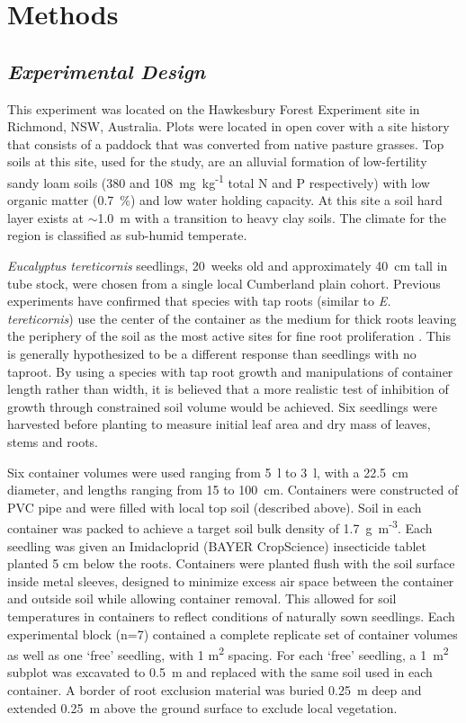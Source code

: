 \documentclass[a4paper]{article}\usepackage[]{graphicx}\usepackage[]{color}
\begin{document}
\section*{Methods}

\subsection*{\textit{Experimental Design}}

This experiment was located on the Hawkesbury Forest Experiment site in Richmond, NSW, Australia. Plots were located in open cover with a site history that consists of a paddock that was converted from native pasture grasses. Top soils at this site, used for the study, are an alluvial formation of low-fertility sandy loam soils (380 and 108~mg~kg\textsuperscript{-1} total N and P respectively) with low organic matter (0.7~\%) and low water holding capacity. At this site a soil hard layer exists at $\sim$1.0~m with a transition to heavy clay soils. The climate for the region is classified as sub-humid temperate. 

\textit{Eucalyptus tereticornis} seedlings, 20~weeks old and approximately 40~cm tall in tube stock, were chosen from a single local Cumberland plain cohort. Previous experiments have confirmed that species with tap roots (similar to \textit{E. tereticornis}) use the center of the container as the medium for thick roots leaving the periphery of the soil as the most active sites for fine root proliferation \citep{biran1980a,biran1980b}. This is generally hypothesized to be a different response than seedlings with no taproot. By using a species with tap root growth and manipulations of container length rather than width, it is believed that a more realistic test of inhibition of growth through constrained soil volume would be achieved. Six seedlings were harvested before planting to measure initial leaf area and dry mass of leaves, stems and roots.

Six container volumes were used ranging from 5~l to 3~l, with a 22.5~cm diameter, and lengths ranging from 15 to 100~cm. Containers were constructed of PVC pipe and were filled with local top soil (described above). Soil in each container was packed to achieve a target soil bulk density of 1.7~g~m\textsuperscript{-3}. Each seedling was given an Imidacloprid (BAYER CropScience) insecticide tablet planted 5 cm below the roots. Containers were planted flush with the soil surface inside metal sleeves, designed to minimize excess air space between the container and outside soil while allowing container removal. This allowed for soil temperatures in containers to reflect conditions of naturally sown seedlings. Each experimental block (n=7) contained a complete replicate set of container volumes as well as one ‘free’ seedling, with 1 m\textsuperscript{2} spacing. For each ‘free’ seedling, a 1~m\textsuperscript{2} subplot was excavated to 0.5~m and replaced with the same soil used in each container. A border of root exclusion material was buried 0.25~m deep and extended 0.25~m above the ground surface to exclude local vegetation.
\end{document}
